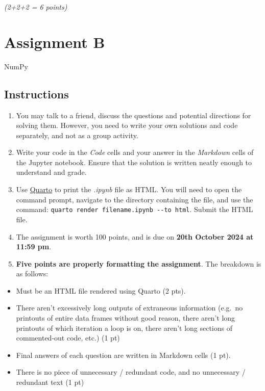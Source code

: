 \documentclass[
  letterpaper,
  DIV=11,
  numbers=noendperiod]{scrreprt}
\providecommand{\tightlist}{%
  \setlength{\itemsep}{0pt}\setlength{\parskip}{0pt}}\usepackage{longtable,booktabs,array}
\begin{document}
\emph{(2+2+2 = 6 points)}

\hypertarget{assignment-b}{%
\chapter{Assignment B}\label{assignment-b}}

NumPy

\hfill\break

\hypertarget{instructions-3}{%
\section*{Instructions}\label{instructions-3}}


\begin{enumerate}
\def\labelenumi{\arabic{enumi}.}
\item
  You may talk to a friend, discuss the questions and potential
  directions for solving them. However, you need to write your own
  solutions and code separately, and not as a group activity.
\item
  Write your code in the \emph{Code} cells and your answer in the
  \emph{Markdown} cells of the Jupyter notebook. Ensure that the
  solution is written neatly enough to understand and grade.
\item
  Use
  \href{https://quarto.org/docs/output-formats/html-basics.html}{Quarto}
  to print the \emph{.ipynb} file as HTML. You will need to open the
  command prompt, navigate to the directory containing the file, and use
  the command: \texttt{quarto\ render\ filename.ipynb\ -\/-to\ html}.
  Submit the HTML file.
\item
  The assignment is worth 100 points, and is due on \textbf{20th October
  2024 at 11:59 pm}.
\item
  \textbf{Five points are properly formatting the assignment}. The
  breakdown is as follows:
\end{enumerate}

\begin{itemize}
\tightlist
\item
  Must be an HTML file rendered using Quarto (2 pts).
\item
  There aren't excessively long outputs of extraneous information
  (e.g.~no printouts of entire data frames without good reason, there
  aren't long printouts of which iteration a loop is on, there aren't
  long sections of commented-out code, etc.) (1 pt)
\item
  Final answers of each question are written in Markdown cells (1 pt).
\item
  There is no piece of unnecessary / redundant code, and no unnecessary
  / redundant text (1 pt)
\end{itemize}
\end{document}
